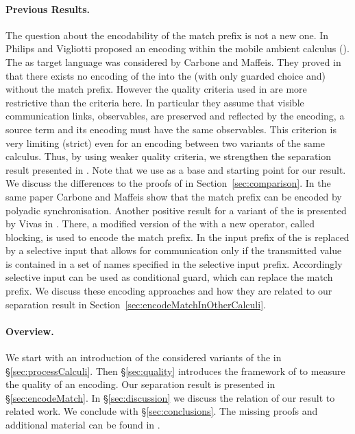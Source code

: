 \documentclass[final,copyright,creativecommons]{eptcs}
\begin{document}
\paragraph{Previous Results.} The question about the encodability of the match prefix is not a new one. In \cite{vig} Philips and Vigliotti proposed an encoding within the mobile ambient calculus (\cite{cardelliGordon00}). The \piCal as target language was considered by Carbone and Maffeis. They proved in \cite{carbone} that there exists no encoding of the \piCal into the \piCal (with only guarded choice and) without the match prefix. However the quality criteria used in \cite{carbone} are more restrictive than the criteria here. In particular they assume that visible communication links, \ie observables, are preserved and reflected by the encoding, \ie a source term and its encoding must have the same observables. This criterion is very limiting (\ie strict) even for an encoding between two variants of the same calculus. Thus, by using weaker quality criteria, we strengthen the separation result presented in \cite{carbone}. Note that we use \cite{carbone} as a base and starting point for our result. We discuss the differences to the proofs of \cite{carbone} in Section~\ref{sec:comparison}.
In the same paper Carbone and Maffeis show that the match prefix can be encoded by polyadic synchronisation.
Another positive result for a variant of the \piCal is presented by Vivas in \cite{vivas}. There, a modified version of the \piCal with a new operator, called blocking, is used to encode the match prefix.
In \cite{bodeiDeganoPriami05} the input prefix of the \piCal is replaced by a selective input that allows for communication only if the transmitted value is contained in a set of names specified in the selective input prefix. Accordingly selective input can be used as conditional guard, which can replace the match prefix. We discuss these encoding approaches and how they are related to our separation result in Section~\ref{sec:encodeMatchInOtherCalculi}.

\paragraph{Overview.} We start with an introduction of the considered variants of the \piCal in \S\ref{sec:processCalculi}. Then \S\ref{sec:quality} introduces the framework of \cite{gorla} to measure the quality of an encoding. Our separation result is presented in \S\ref{sec:encodeMatch}. In \S\ref{sec:discussion} we discuss the relation of our result to related work. We conclude with \S\ref{sec:conclusions}.
The missing proofs and additional material can be found in \cite{pynT14}.
\end{document}
